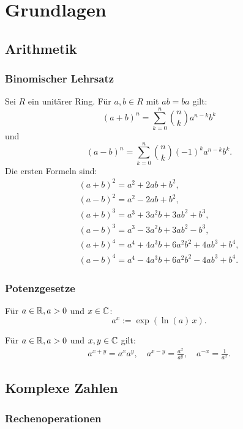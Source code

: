 
\chapter{Grundlagen}
\section{Arithmetik}
\subsection{Binomischer Lehrsatz}
Sei $R$ ein unitärer Ring. 
Für $a,b\in R$ mit $ab=ba$ gilt:%
\begin{equation}
(a+b)^n = \sum_{k=0}^n \binom{n}{k} a^{n-k} b^k
\end{equation}
und
\begin{equation}
(a-b)^n = \sum_{k=0}^n \binom{n}{k} (-1)^k a^{n-k} b^k.
\end{equation}
Die ersten Formeln sind:
\begin{gather}
(a+b)^2 = a^2+2ab+b^2,\\
(a-b)^2 = a^2-2ab+b^2,\\
(a+b)^3 = a^3+3a^2 b+3ab^2+b^3,\\
(a-b)^3 = a^3-3a^2 b+3ab^2-b^3,\\
(a+b)^4 = a^4+4a^3 b+6a^2 b^2+4ab^3+b^4,\\
(a-b)^4 = a^4-4a^3 b+6a^2 b^2-4ab^3+b^4.
\end{gather}
\subsection{Potenzgesetze}
\begin{Definition}
Für $a\in\mathbb R, a>0$ und $x\in\mathbb C$:
\begin{equation}
a^x := \exp(\ln(a)\,x).
\end{equation}
\end{Definition}
\noindent
Für $a\in\mathbb R, a>0$ und $x,y\in\mathbb C$ gilt:
\begin{gather}
a^{x+y} = a^x a^y,\quad a^{x-y} = \frac{a^x}{a^y},
\quad a^{-x} = \frac{1}{a^x}.
\end{gather}

\section{Komplexe Zahlen}
\subsection{Rechenoperationen}

